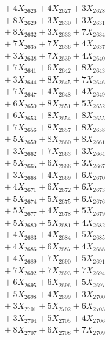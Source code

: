 \documentclass[a4paper,10pt]{article}
\begin{document}
{\begin{align}
&\;  + 4 X_{2626} + 4 X_{2627} + 3 X_{2628} \\[0.3ex]
&\;  + 8 X_{2629} + 3 X_{2630} + 3 X_{2631} \\[0.3ex]
&\;  + 8 X_{2632} + 3 X_{2633} + 7 X_{2634} \\[0.3ex]
&\;  + 7 X_{2635} + 7 X_{2636} + 4 X_{2637} \\[0.3ex]
&\;  + 3 X_{2638} + 7 X_{2639} + 4 X_{2640} \\[0.3ex]
&\;  + 7 X_{2641} + 6 X_{2642} + 8 X_{2643} \\[0.3ex]
&\;  + 3 X_{2644} + 8 X_{2645} + 7 X_{2646} \\[0.3ex]
&\;  + 7 X_{2647} + 4 X_{2648} + 4 X_{2649} \\[0.5ex]\allowbreak
&\;  + 6 X_{2650} + 8 X_{2651} + 5 X_{2652} \\[0.3ex]
&\;  + 6 X_{2653} + 8 X_{2654} + 8 X_{2655} \\[0.3ex]
&\;  + 7 X_{2656} + 8 X_{2657} + 8 X_{2658} \\[0.3ex]
&\;  + 5 X_{2659} + 8 X_{2660} + 8 X_{2661} \\[0.3ex]
&\;  + 3 X_{2662} + 7 X_{2663} + 3 X_{2664} \\[0.3ex]
&\;  + 5 X_{2665} + 6 X_{2666} + 3 X_{2667} \\[0.3ex]
&\;  + 3 X_{2668} + 4 X_{2669} + 6 X_{2670} \\[0.3ex]
&\;  + 4 X_{2671} + 6 X_{2672} + 6 X_{2673} \\[0.3ex]
&\;  + 5 X_{2674} + 5 X_{2675} + 6 X_{2676} \\[0.3ex]
&\;  + 5 X_{2677} + 4 X_{2678} + 5 X_{2679} \\[0.5ex]\allowbreak
&\;  + 5 X_{2680} + 5 X_{2681} + 4 X_{2682} \\[0.3ex]
&\;  + 4 X_{2683} + 4 X_{2684} + 5 X_{2685} \\[0.3ex]
&\;  + 4 X_{2686} + 6 X_{2687} + 4 X_{2688} \\[0.3ex]
&\;  + 4 X_{2689} + 7 X_{2690} + 5 X_{2691} \\[0.3ex]
&\;  + 7 X_{2692} + 7 X_{2693} + 7 X_{2694} \\[0.3ex]
&\;  + 6 X_{2695} + 6 X_{2696} + 5 X_{2697} \\[0.3ex]
&\;  + 5 X_{2698} + 4 X_{2699} + 3 X_{2700} \\[0.3ex]
&\;  + 3 X_{2701} + 5 X_{2702} + 6 X_{2703} \\[0.3ex]
&\;  + 3 X_{2704} + 5 X_{2705} + 4 X_{2706} \\[0.3ex]
&\;  + 8 X_{2707} + 6 X_{2708} + 7 X_{2709} \\[0.5ex]\allowbreak

\end{align}}
\end{document}
